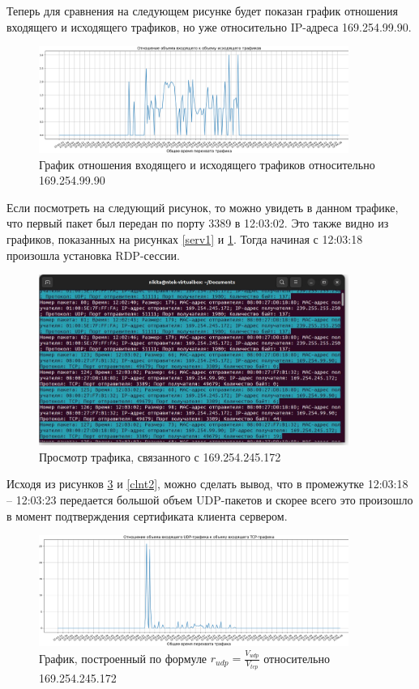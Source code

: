 \documentclass[bachelor, och, coursework]{SCWorks}
\begin{document}
  Теперь для сравнения на следующем рисунке будет показан график отношения входящего и исходящего трафиков, но уже относительно IP-адреса 169.254.99.90.

  \begin{figure}[H]
    \centering
    \includegraphics[width=0.9\textwidth]{photo/clnt-1.png}
    \caption{График отношения входящего и исходящего трафиков относительно 169.254.99.90}
    \label{clnt1}
  \end{figure}

  Если посмотреть на следующий рисунок, то можно увидеть в данном трафике, что первый пакет был передан по порту 3389 в 12:03:02. Это также видно из
  графиков, показанных на рисунках \ref{serv1} и \ref{clnt1}. Тогда начиная с 12:03:18 произошла установка RDP-сессии.
  
  \begin{figure}[H]
    \centering
    \includegraphics[width=0.9\textwidth]{photo/traffic-1.jpg}
    \caption{Просмотр трафика, связанного с 169.254.245.172}
    \label{traf1}
  \end{figure}
  
  Исходя из рисунков \ref{serv2} и \ref{clnt2}, можно сделать вывод, что в промежутке 12:03:18 -- 12:03:23 передается большой объем UDP-пакетов и 
  скорее всего это произошло в момент подтверждения сертификата клиента сервером.

  \begin{figure}[H]
    \centering
    \includegraphics[width=0.9\textwidth]{photo/serv-2.png}
    \caption{График, построенный по формуле $r_{udp} = \frac{V_{udp}}{V_{tcp}}$ относительно 169.254.245.172}
    \label{serv2}
  \end{figure}
\end{document}
